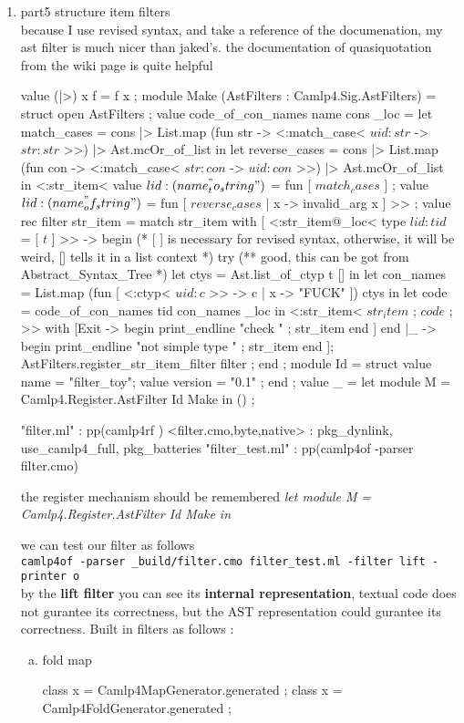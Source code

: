 \begin{enumerate}
\item part5 structure item filters \\
  because I use revised syntax, and take a reference of the
  documenation, my ast filter is much nicer than jaked's.
  the documentation of quasiquotation from the wiki page is quite
  helpful 
\begin{bluecode}
value (|>) x f = f x ;
module Make (AstFilters : Camlp4.Sig.AstFilters) = struct 
  open AstFilters ; 
  value code_of_con_names name cons _loc =
    let match_cases = 
      cons |> 
      List.map 
        (fun str -> <:match_case< $uid:str$ -> $str:str$ >>)
      |> Ast.mcOr_of_list  in 
    let reverse_cases = 
      cons |> 
      List.map (fun con -> <:match_case< $str:con$ -> $uid:con$ >>)
        |> Ast.mcOr_of_list in 
    <:str_item< 
      value $lid:(name^"_to_string") $ =
        fun [ $match_cases$ ] ; 
      value $lid:(name^"_of_string") $ = 
        fun [ $reverse_cases$ | x -> invalid_arg  x ] >> ; 
  value rec filter str_item = match str_item with 
      [ <:str_item@_loc< type $lid:tid$  = [ $t$ ] >> -> begin 
        (* [ ] is necessary for revised syntax, 
           otherwise, it will be weird, [] tells it in a list context 
         *)
        try 
         (** good, this can be got from Abstract_Syntax_Tree *)
          let ctys = Ast.list_of_ctyp t [] in 
          let con_names  = 
            List.map (fun [ <:ctyp< $uid:c $ >> -> c 
                          | x -> "FUCK" ]) ctys in 
          let code  = code_of_con_names tid con_names _loc in 
          <:str_item< $str_item$ ; $code$ ; >>
        with 
            [Exit ->  begin 
              print_endline "check " ; 
              str_item end ] 
      end 
      |_ -> begin print_endline "not simple type " ; str_item end ];
  AstFilters.register_str_item_filter filter ;   
end ;
module Id = struct 
  value name = "filter_toy"; 
  value version = "0.1" ; 
end ; 
value _ = 
  let module M =  Camlp4.Register.AstFilter Id Make in 
  () ; 
\end{bluecode}

\begin{bluetext}
"filter.ml" : pp(camlp4rf )
<filter.{cmo,byte,native}> : pkg_dynlink, use_camlp4_full, pkg_batteries
"filter_test.ml" : pp(camlp4of -parser filter.cmo)
\end{bluetext}

the register mechanism should be remembered
\textit{let module M =  Camlp4.Register.AstFilter Id Make in}

we can test our filter as follows \\
\verb|camlp4of -parser _build/filter.cmo filter_test.ml -filter lift -printer o |\\
by the \textbf{lift filter} you can see its \textbf{internal representation}, textual
code does not gurantee its correctness, but the AST representation
could gurantee its correctness.
Built in filters as follows : 
\begin{enumerate}[(a)]
\item fold map
  \begin{bluetext}
  class x = Camlp4MapGenerator.generated ;
  class x = Camlp4FoldGenerator.generated ;
  \end{bluetext}


\end{enumerate}
\end{enumerate}
